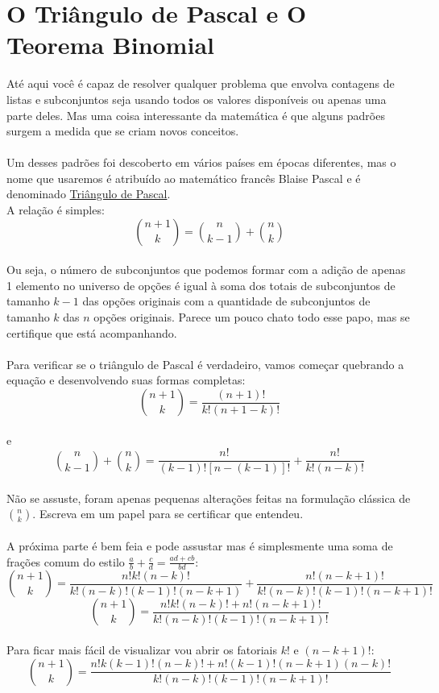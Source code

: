 \documentclass[a4paper,11pt]{book}
\theoremstyle{definition}
\theoremstyle{break}
\begin{document}
\section{O Triângulo de Pascal e O Teorema Binomial}
Até aqui você é capaz de resolver qualquer problema que envolva contagens de listas e subconjuntos seja usando todos os valores disponíveis ou apenas uma parte deles. Mas uma coisa interessante da matemática é que alguns padrões surgem a medida que se criam novos conceitos.
\\
\\
Um desses padrões foi descoberto em vários países em épocas diferentes, mas o nome que usaremos é atribuído ao matemático francês Blaise Pascal e é denominado \href{https://pt.wikipedia.org/wiki/Tri\%C3\%A2ngulo_de_Pascal}{Triângulo de Pascal}.
\\
A relação é simples:
\\
$$ {n+1 \choose k} = {n \choose k-1} + {n \choose k} $$
\\
Ou seja, o número de subconjuntos que podemos formar com a adição de apenas 1 elemento no universo de opções é igual à soma dos totais de subconjuntos de tamanho $k-1$ das opções originais com a quantidade de subconjuntos de tamanho $k$ das $n$ opções originais. Parece um pouco chato todo esse papo, mas se certifique que está acompanhando.
\\
\\
Para verificar se o triângulo de Pascal é verdadeiro, vamos começar quebrando a equação e desenvolvendo suas formas completas:
$$ {n+1 \choose k} = \frac{(n+1)!}{k!(n+1-k)!}$$
\\
e
\\
$${n \choose k-1} + {n \choose k} = \frac{n!}{(k-1)![n-(k-1)]!} + \frac{n!}{k!(n-k)!}$$
\\
Não se assuste, foram apenas pequenas alterações feitas na formulação clássica de $n \choose k$. Escreva em um papel para se certificar que entendeu.
\\
\\
A próxima parte é bem feia e pode assustar mas é simplesmente uma soma de frações comum do estilo $\frac{a}{b} + \frac{c}{d} = \frac{ad+cb}{bd}$:
$${n+1 \choose k} = \frac{n!k!(n-k)!}{k!(n-k)!(k-1)!(n-k+1)} + \frac{n!(n-k+1)!}{k!(n-k)!(k-1)!(n-k+1)!}$$
$${n+1 \choose k} = \frac{n!k!(n-k)! + n!(n-k+1)!}{k!(n-k)!(k-1)!(n-k+1)!}$$
\\
Para ficar mais fácil de visualizar vou abrir os fatoriais $k!$ e $(n-k+1)!$:
$${n+1 \choose k} = \frac{n!k(k-1)!(n-k)! + n!(k-1)!(n-k+1)(n-k)!}{k!(n-k)!(k-1)!(n-k+1)!}$$
\end{document}
